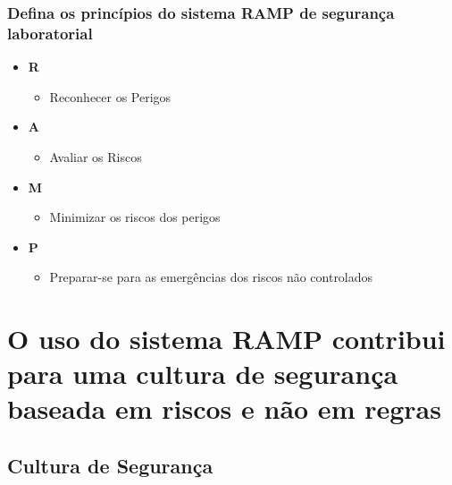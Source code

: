 \documentclass[
  letterpaper,
  DIV=11,
  numbers=noendperiod]{scrartcl}
\providecommand{\tightlist}{%
  \setlength{\itemsep}{0pt}\setlength{\parskip}{0pt}}\usepackage{longtable,booktabs,array}
\begin{document}
\subsubsection{Defina os princípios do sistema RAMP de segurança
laboratorial}\label{defina-os-princuxedpios-do-sistema-ramp-de-seguranuxe7a-laboratorial}

\begin{itemize}
\tightlist
\item
  \textbf{R}

  \begin{itemize}
  \tightlist
  \item
    Reconhecer os Perigos
  \end{itemize}
\item
  \textbf{A}

  \begin{itemize}
  \tightlist
  \item
    Avaliar os Riscos
  \end{itemize}
\end{itemize}

\begin{itemize}
\tightlist
\item
  \textbf{M}

  \begin{itemize}
  \tightlist
  \item
    Minimizar os riscos dos perigos
  \end{itemize}
\item
  \textbf{P}

  \begin{itemize}
  \tightlist
  \item
    Preparar-se para as emergências dos riscos não controlados
  \end{itemize}
\end{itemize}

\section{\texorpdfstring{O uso do sistema RAMP contribui para uma
\textbf{cultura de segurança} baseada em \textbf{riscos} e não em
\textbf{regras}}{O uso do sistema RAMP contribui para uma cultura de segurança baseada em riscos e não em regras}}\label{o-uso-do-sistema-ramp-contribui-para-uma-cultura-de-seguranuxe7a-baseada-em-riscos-e-nuxe3o-em-regras}

\subsection{Cultura de Segurança}\label{cultura-de-seguranuxe7a}
\end{document}
